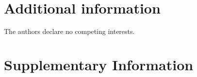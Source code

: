 \documentclass[fleqn,10pt]{wlscirep}
\begin{document}
\section*{Additional information}

The authors declare no competing interests.

\section*{Supplementary Information}

\end{document}
